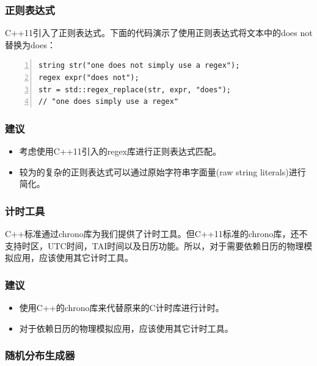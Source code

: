 \documentclass{ctexart}
\begin{document}
\subsubsection{正则表达式}

C++11引入了正则表达式。下面的代码演示了使用正则表达式将文本中的does not替换为does：

\begin{lstlisting}[language={[ANSI]C},keywordstyle=\color{blue!70},commentstyle=\color{red!50!green!50!blue!50},frame=shadowbox, rulesepcolor=\color{red!20!green!20!blue!20},basicstyle=\small,numbers=left, numberstyle=\tiny,breaklines=true]
string str("one does not simply use a regex");  
regex expr("does not");
str = std::regex_replace(str, expr, "does");
// "one does simply use a regex"
\end{lstlisting}

\subsubsection*{建议}

\begin{itemize}
	\item 考虑使用C++11引入的regex库进行正则表达式匹配。
	\item 较为的复杂的正则表达式可以通过原始字符串字面量(raw string literals)进行简化。
\end{itemize}

\subsubsection{计时工具}

C++标准通过chrono库为我们提供了计时工具。但C++11标准的chrono库，还不支持时区，UTC时间，TAI时间以及日历功能。所以，对于需要依赖日历的物理模拟应用，应该使用其它计时工具。

\subsubsection*{建议}

\begin{itemize}
	\item 使用C++的chrono库来代替原来的C计时库进行计时。
	\item 对于依赖日历的物理模拟应用，应该使用其它计时工具。
\end{itemize}

\subsubsection{随机分布生成器}
\end{document}
